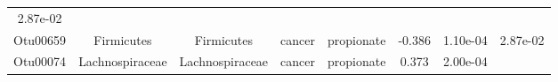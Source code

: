 \documentclass[11pt,]{article}
\begin{document}
\begin{longtable}[]{@{}cccccccc@{}}
\begin{minipage}[t]{0.08\columnwidth}
2.87e-02\strut
\end{minipage}\tabularnewline
\begin{minipage}[t]{0.08\columnwidth}\centering\strut
Otu00659\strut
\end{minipage} & \begin{minipage}[t]{0.15\columnwidth}\centering\strut
Firmicutes\strut
\end{minipage} & \begin{minipage}[t]{0.15\columnwidth}\centering\strut
Firmicutes\strut
\end{minipage} & \begin{minipage}[t]{0.08\columnwidth}\centering\strut
cancer\strut
\end{minipage} & \begin{minipage}[t]{0.09\columnwidth}\centering\strut
propionate\strut
\end{minipage} & \begin{minipage}[t]{0.07\columnwidth}\centering\strut
-0.386\strut
\end{minipage} & \begin{minipage}[t]{0.08\columnwidth}\centering\strut
1.10e-04\strut
\end{minipage} & \begin{minipage}[t]{0.08\columnwidth}\centering\strut
2.87e-02\strut
\end{minipage}\tabularnewline
\begin{minipage}[t]{0.08\columnwidth}\centering\strut
Otu00074\strut
\end{minipage} & \begin{minipage}[t]{0.15\columnwidth}\centering\strut
Lachnospiraceae\strut
\end{minipage} & \begin{minipage}[t]{0.15\columnwidth}\centering\strut
Lachnospiraceae\strut
\end{minipage} & \begin{minipage}[t]{0.08\columnwidth}\centering\strut
cancer\strut
\end{minipage} & \begin{minipage}[t]{0.09\columnwidth}\centering\strut
propionate\strut
\end{minipage} & \begin{minipage}[t]{0.07\columnwidth}\centering\strut
0.373\strut
\end{minipage} & \begin{minipage}[t]{0.08\columnwidth}\centering\strut
2.00e-04\strut
\end{minipage} & \begin{minipage}[t]{0.08\columnwidth}\centering\strut

\end{minipage}
\end{longtable}
\end{document}
